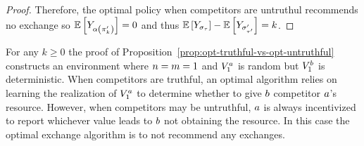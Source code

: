 \begin{proof}
    Therefore, the optimal policy when competitors are untruthul recommends no exchange so 
    \(
        \mathbb{E}\left[
            Y_{
                \alpha\left(
                    \pi'_k
                \right)
            }
        \right]
        =0
    \)
    and thus
    \(
        \mathbb{E}\left[
            Y_{
                \sigma_{
                    \tau
                }
            }
        \right]
        -
        \mathbb{E}\left[
            Y_{
                \sigma'_{
                    \tau'
                }
            }
        \right]
        =k
    \).
\end{proof}  

For any $k\geq 0$ the proof of Proposition~\ref{prop:opt-truthful-vs-opt-untruthful} constructs an environment
where $n=m=1$ and $V^a_{1}$ is random but $V^b_{1}$ is deterministic. When 
competitors are truthful, an optimal algorithm
relies on learning the realization of $V^a_{1}$ to determine whether to give $b$ competitor $a$'s
resource. However, when competitors may be untruthful,
$a$ is always incentivized to report whichever value leads to $b$ not obtaining
the resource. In this case the optimal exchange algorithm is to not recommend any exchanges.
